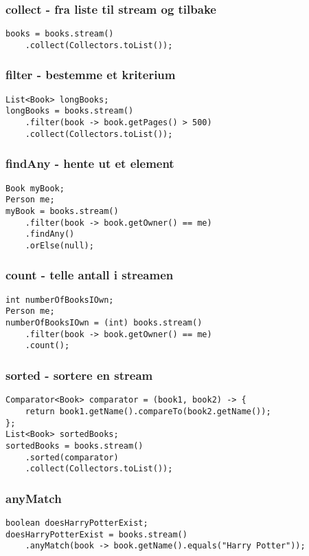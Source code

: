 \documentclass{article}
\begin{document}
\subsubsection{collect - fra liste til stream og tilbake}
\begin{verbatim}
books = books.stream()
    .collect(Collectors.toList());
\end{verbatim}


\subsubsection{filter - bestemme et kriterium}
\begin{verbatim}
List<Book> longBooks;
longBooks = books.stream()
    .filter(book -> book.getPages() > 500)
    .collect(Collectors.toList());
\end{verbatim}


\subsubsection{findAny - hente ut et element}
\begin{verbatim}
Book myBook;
Person me;
myBook = books.stream()
    .filter(book -> book.getOwner() == me)
    .findAny()
    .orElse(null);
\end{verbatim}


\subsubsection{count - telle antall i streamen}
\begin{verbatim}
int numberOfBooksIOwn;
Person me;
numberOfBooksIOwn = (int) books.stream()
    .filter(book -> book.getOwner() == me)
    .count();
\end{verbatim}


\subsubsection{sorted - sortere en stream}
\begin{verbatim}
Comparator<Book> comparator = (book1, book2) -> {
    return book1.getName().compareTo(book2.getName());
};
List<Book> sortedBooks;
sortedBooks = books.stream()
    .sorted(comparator)
    .collect(Collectors.toList());
\end{verbatim}


\subsubsection{anyMatch}
\begin{verbatim}
boolean doesHarryPotterExist;
doesHarryPotterExist = books.stream()
    .anyMatch(book -> book.getName().equals("Harry Potter"));
\end{verbatim}
\end{document}
